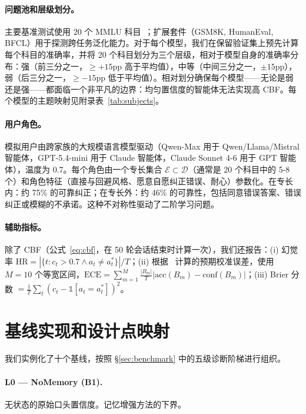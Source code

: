 \documentclass[11pt,a4paper,fontset=fandol]{ctexart}
\begin{document}
\paragraph{问题池和层级划分。} 主要基准测试使用 20 个 MMLU 科目~\citep{hendrycks2021measuring}；扩展套件（GSM8K, HumanEval, BFCL）用于探测跨任务泛化能力。对于每个模型，我们在保留验证集上预先计算每个科目的准确率，并将 20 个科目划分为三个层级，相对于模型自身的准确率分布：强（前三分之一，$\geq +15$pp 高于平均值），中等（中间三分之一，$\pm 15$pp），弱（后三分之一，$\geq -15$pp 低于平均值）。相对划分确保每个模型——无论是弱还是强——都面临一个非平凡的边界：均匀置信度的智能体无法实现高 CBF。每个模型的主题映射见附录表~\ref{tab:subjects}。

\paragraph{用户角色。} 模拟用户由跨家族的大规模语言模型驱动（Qwen-Max 用于 Qwen/Llama/Mistral 智能体，GPT-5.4-mini 用于 Claude 智能体，Claude Sonnet 4-6 用于 GPT 智能体），温度为 0.7。每个角色由一个专长集合 $\mathcal{E} \subset \mathcal{D}$（通常是 20 个科目中的 5-8 个）和角色特征（直接与回避风格、愿意自愿纠正错误、耐心）参数化。在专长内：约 75\% 的可靠纠正；在专长外：约 46\% 的可靠性，包括同意错误答案、错误纠正或模糊的不承诺。这种不对称性驱动了二阶学习问题。

\paragraph{辅助指标。} 除了 CBF（公式~\eqref{eq:cbf}，在 50 轮会话结束时计算一次），我们还报告：(i) 幻觉率 $\text{HR} = |\{t : c_t > 0.7 \wedge a_t \neq a_t^*\}| / T$；(ii) 根据~\citet{guo2017calibration} 计算的预期校准误差，使用 $M = 10$ 个等宽区间，$\text{ECE} = \sum_{m=1}^M \frac{|B_m|}{T} | \text{acc}(B_m) - \text{conf}(B_m) |$；(iii) Brier 分数 $= \frac{1}{T} \sum_t (c_t - \mathbb{1}[a_t = a_t^*])^2$。

\section{基线实现和设计点映射}
\label{app:baselines}

我们实例化了十个基线，按照 \S\ref{sec:benchmark} 中的五级诊断阶梯进行组织。

\paragraph{L0 --- NoMemory (B1).} 无状态的原始口头置信度。记忆增强方法的下界。
\end{document}
